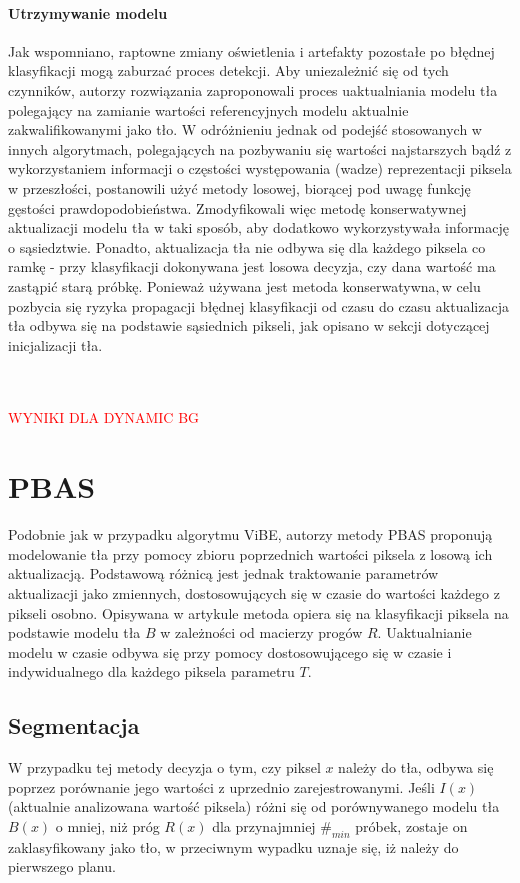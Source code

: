 \paragraph{Utrzymywanie modelu \\}
Jak wspomniano, raptowne zmiany oświetlenia i artefakty pozostałe po błędnej klasyfikacji mogą zaburzać proces detekcji. Aby uniezależnić się od tych czynników, autorzy rozwiązania zaproponowali proces uaktualniania modelu tła polegający na zamianie wartości referencyjnych modelu aktualnie zakwalifikowanymi jako tło. W odróżnieniu jednak od podejść stosowanych w innych algorytmach, polegających na pozbywaniu się wartości najstarszych bądź z wykorzystaniem informacji o częstości występowania (wadze) reprezentacji piksela w przeszłości, postanowili użyć metody losowej, biorącej pod uwagę funkcję gęstości prawdopodobieństwa. Zmodyfikowali więc metodę konserwatywnej aktualizacji modelu tła w taki sposób, aby dodatkowo wykorzystywała informację o sąsiedztwie. Ponadto, aktualizacja tła nie odbywa się dla każdego piksela co ramkę - przy klasyfikacji dokonywana jest losowa decyzja, czy dana wartość ma zastąpić starą próbkę. Ponieważ używana jest metoda konserwatywna,\,w celu pozbycia się ryzyka propagacji błędnej klasyfikacji od czasu do czasu aktualizacja tła odbywa się na podstawie sąsiednich pikseli, jak opisano w sekcji dotyczącej inicjalizacji tła.\\ \\ \\
\begin{LARGE}
\textcolor{red}{WYNIKI DLA DYNAMIC BG}
\end{LARGE}
\section{PBAS}
Podobnie jak w przypadku algorytmu ViBE, autorzy metody PBAS proponują modelowanie tła przy pomocy zbioru poprzednich wartości piksela z losową ich aktualizacją. Podstawową różnicą jest jednak traktowanie parametrów aktualizacji jako zmiennych, dostosowujących się w czasie do wartości każdego z pikseli osobno. Opisywana w artykule \cite{hofmann2012background} metoda opiera się na klasyfikacji piksela na podstawie modelu tła $B$ w zależności od macierzy progów $R$. Uaktualnianie modelu w czasie odbywa się przy pomocy dostosowującego się w czasie i indywidualnego dla każdego piksela parametru $T$.
\subsection{Segmentacja}
W przypadku tej metody decyzja o tym, czy piksel $x$ należy do tła, odbywa się poprzez porównanie jego wartości z uprzednio zarejestrowanymi. Jeśli $I(x)$ (aktualnie analizowana wartość piksela) różni się od porównywanego modelu tła $B(x)$ o mniej, niż próg $R(x)$ dla przynajmniej $\#_{min}$ próbek, zostaje on zaklasyfikowany jako tło, w przeciwnym wypadku uznaje się, iż należy do pierwszego planu.
